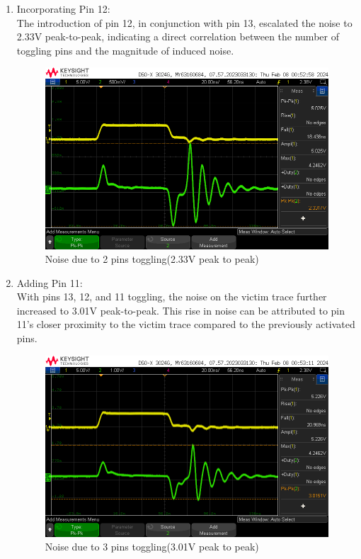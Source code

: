 \documentclass[a4paper,11pt]{article}%
\begin{document}
\begin{enumerate}
	\item Incorporating Pin 12:\\ The introduction of pin 12, in conjunction with pin 13, escalated the noise to 2.33V peak-to-peak, indicating a direct correlation between the number of toggling pins and the magnitude of induced noise.
	\begin{figure}[H]
		\centering
		\includegraphics[scale=0.5]{figures/noise_np__cr2.png}
		\caption{Noise due to 2 pins toggling(2.33V peak to peak)}
		\label{noise_np__cr2}
	\end{figure}
	
	\item Adding Pin 11:\\ With pins 13, 12, and 11 toggling, the noise on the victim trace further increased to 3.01V peak-to-peak. This rise in noise can be attributed to pin 11's closer proximity to the victim trace compared to the previously activated pins.
	\begin{figure}[H]
		\centering
		\includegraphics[scale=0.5]{figures/noise_np__cr3.png}
		\caption{Noise due to 3 pins toggling(3.01V peak to peak)}
		\label{noise_np__cr3}
	\end{figure}
	

\end{enumerate}
\end{document}

